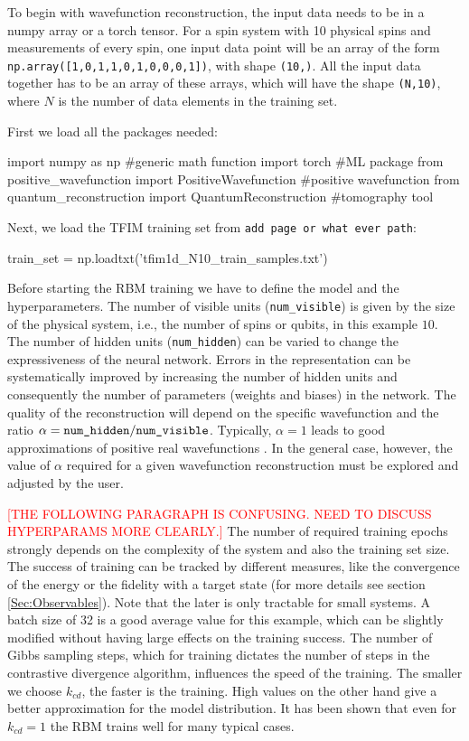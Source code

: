\documentclass[submission, Phys]{SciPost}
\begin{document}
To begin with wavefunction reconstruction, the input data needs to be in a numpy array or a torch tensor. 
For a spin system with 10 physical spins and measurements of every spin, one input data point will be an array of the form 
\verb|np.array([1,0,1,1,0,1,0,0,0,1])|, with shape \verb|(10,)|. 
All the input data together has to be an array of these arrays, which will have the shape \verb|(N,10)|, where $N$ is the number of data elements in the training set.

First we load all the packages needed:
\begin{python}
import numpy as np 		#generic math function
import torch 			#ML package
from positive_wavefunction import PositiveWavefunction #positive wavefunction
from quantum_reconstruction import QuantumReconstruction #tomography tool
\end{python} 

Next, we load the TFIM training set from \verb|add page or what ever path|:

\begin{python}
train_set =  np.loadtxt('tfim1d_N10_train_samples.txt')
\end{python}

Before starting the RBM training we have to define the model and the hyperparameters. 
The number of visible units (\verb|num_visible|) is given by the size of the physical system, i.e., the number of spins or qubits, in this example $10$. 
The number of hidden units (\verb|num_hidden|) can be varied to change the expressiveness of the neural network.
Errors in the representation can be systematically improved by increasing the number of hidden units and consequently 
the number of parameters (weights and biases) in the network.
The quality of the reconstruction will depend on the specific wavefunction and the ratio $\alpha = \verb|num_hidden|/\verb|num_visible|$. 
Typically, $\alpha = 1$ leads to good approximations of positive real wavefunctions \cite{Torlai2016thermo}.  
In the general case, however, the value of $\alpha$ required for a given wavefunction reconstruction must be explored and adjusted by the user.

\textcolor{red}{[THE FOLLOWING PARAGRAPH IS CONFUSING. NEED TO DISCUSS HYPERPARAMS MORE CLEARLY.]}
The number of required training epochs strongly depends on the complexity of the system and also the training set size. The success of training can be tracked by different measures, like the convergence of the energy or the fidelity with a target state (for more details see section \ref{Sec:Observables}). Note that the later is only tractable for small systems. A batch size of 32 is a good average value for this example, which can be slightly modified without having large effects on the training success. The number of Gibbs sampling steps,
which for training dictates the number of steps in the contrastive divergence algorithm, 
influences the speed of the training. The smaller we choose $k_{cd}$, the faster is the training. High values on the other hand give a better approximation for the model distribution. It has been shown that even for $k_{cd}=1$ the RBM trains well for many typical cases\cite{hinton2002training}.
\end{document}

